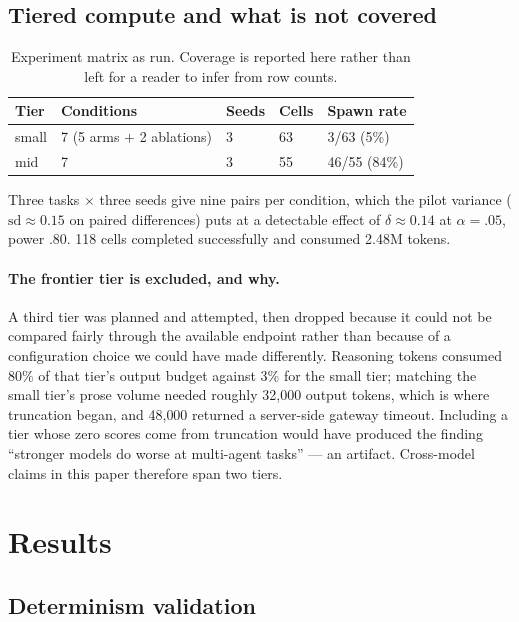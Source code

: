\documentclass[10pt]{article}
\begin{document}
\subsection{Tiered compute and what is not covered}

\begin{table}[t]
\centering
\caption{Experiment matrix as run. Coverage is reported here rather than left
for a reader to infer from row counts.}
\label{tab:matrix}
\begin{tabular}{lllll}
\toprule
Tier & Conditions & Seeds & Cells & Spawn rate \\
\midrule
small & 7 (5 arms $+$ 2 ablations) & 3 & 63 & 3/63 (5\%) \\
mid   & 7                          & 3 & 55 & 46/55 (84\%) \\
\bottomrule
\end{tabular}
\end{table}

Three tasks $\times$ three seeds give nine pairs per condition, which the pilot
variance ($\mathrm{sd} \approx 0.15$ on paired differences) puts at a detectable
effect of $\delta \approx 0.14$ at $\alpha = .05$, power $.80$. 118 cells
completed successfully and consumed 2.48M tokens.

\paragraph{The frontier tier is excluded, and why.}
A third tier was planned and attempted, then dropped because it could not be
compared fairly through the available endpoint rather than because of a
configuration choice we could have made differently. Reasoning tokens consumed
80\% of that tier's output budget against 3\% for the small tier; matching the
small tier's prose volume needed roughly 32{,}000 output tokens, which is where
truncation began, and 48{,}000 returned a server-side gateway timeout. Including
a tier whose zero scores come from truncation would have produced the finding
``stronger models do worse at multi-agent tasks'' --- an artifact. Cross-model
claims in this paper therefore span two tiers.

\section{Results}
\label{sec:results}



\subsection{Determinism validation}
\end{document}
